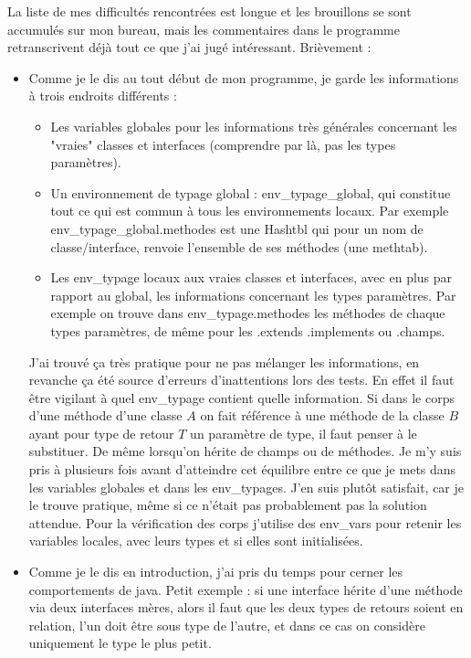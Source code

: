\documentclass[12pt,a4paper]{report}
\begin{document}
La liste de mes difficultés rencontrées est longue et les brouillons se sont accumulés sur mon bureau, mais les commentaires dans le programme retranscrivent déjà tout ce que j'ai jugé intéressant. Brièvement :
\begin{itemize}[label=\textbullet]
\item Comme je le dis au tout début de mon programme, je garde les informations à trois endroits différents : 
\begin{itemize}
\item Les variables globales pour les informations très générales concernant les "vraies" classes et interfaces (comprendre par là, pas les types paramètres).
\item Un environnement de typage global : env\_typage\_global, qui constitue tout ce qui est commun à tous les environnements locaux. Par exemple env\_typage\_global.methodes est une Hashtbl qui pour un nom de classe/interface, renvoie l'ensemble de ses méthodes (une methtab).
\item Les env\_typage locaux aux vraies classes et interfaces, avec en plus par rapport au global, les informations concernant les types paramètres. Par exemple on trouve dans env\_typage.methodes les méthodes de chaque types paramètres, de même pour les .extends .implements ou .champs.
\end{itemize}
J'ai trouvé ça très pratique pour ne pas mélanger les informations, en revanche ça été source d'erreurs d'inattentions lors des tests. En effet il faut être vigilant à quel env\_typage contient quelle information. Si dans le corps d'une méthode d'une classe $A$ on fait référence à une méthode de la classe $B$ ayant pour type de retour $T$ un paramètre de type, il faut penser à le substituer. De même lorsqu'on hérite de champs ou de méthodes. Je m'y suis pris à plusieurs fois avant d'atteindre cet équilibre entre ce que je mets dans les variables globales et dans les env\_typages. J'en suis plutôt satisfait, car je le trouve pratique, même si ce n'était pas probablement pas la solution attendue. Pour la vérification des corps j'utilise des env\_vars pour retenir les variables locales, avec leurs types et si elles sont initialisées.
\item Comme je le dis en introduction, j'ai pris du temps pour cerner les comportements de java. Petit exemple : si une interface hérite d'une méthode via deux interfaces mères, alors il faut que les deux types de retours soient en relation, l'un doit être sous type de l'autre, et dans ce cas on considère uniquement le type le plus petit. \\

\end{itemize}
\end{document}
